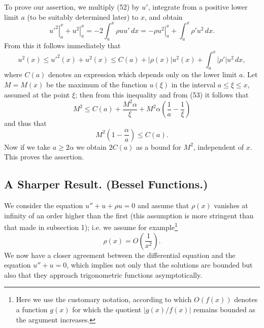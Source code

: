 To prove our assertion, we multiply (52) by $u'$, integrate from a positive lower limit $a$ (to be suitably determined later) to $x$, and obtain
\begin{equation}
\left.u'^2\right|_a^x+\left.u^2\right|_a^x=-2\int_a^x\rho uu'\,dx=-\left.\rho u^2\right|_a^x+\int_a^x\rho'u^2\,dx.
\tag{54}
\end{equation}
From this it follows immediately that
\[
u^2(x)\le u'^2(x)+u^2(x)\le C(a)+|\rho(x)|u^2(x)+\int_a^x|\rho'|u^2\,dx,
\]
where $C(a)$ denotes an expression which depends only on the lower limit $a$. Let $M=M(x)$ be the maximum of the function $u(\xi)$ in the interval $a\le\xi\le x$, assumed at the point $\xi$; then from this inequality and from (53) it follows that
\[
M^2\le C(a)+\frac{M^2\alpha}{\xi}+M^2\alpha\left(\frac1a-\frac1\xi\right)
\]
and thus that
\[
M^2\left(1-\frac\alpha a\right)\le C(a).
\]
Now if we take $a\ge2\alpha$ we obtain $2C(a)$ as a bound for $M^2$, independent of $x$. This proves the assertion.

\subsection{A Sharper Result. (Bessel Functions.)}
We consider the equation $u''+u+\rho u=0$ and assume that $\rho(x)$ vanishes at infinity of an order higher than the first (this assumption is more stringent than that made in subsection 1); i.e. we assume for example\footnote{Here we use the customary notation, according to which $O(f(x))$ denotes a function $g(x)$ for which the quotient $|g(x)/f(x)|$ remains bounded as the argument increases.}
\begin{equation}
\rho(x)=O\left(\frac1{x^2}\right).
\tag{55}
\end{equation}
We now have a closer agreement between the differential equation and the equation $u''+u=0$, which implies not only that the solutions are bounded but also that they approach trigonometric functions asymptotically.

